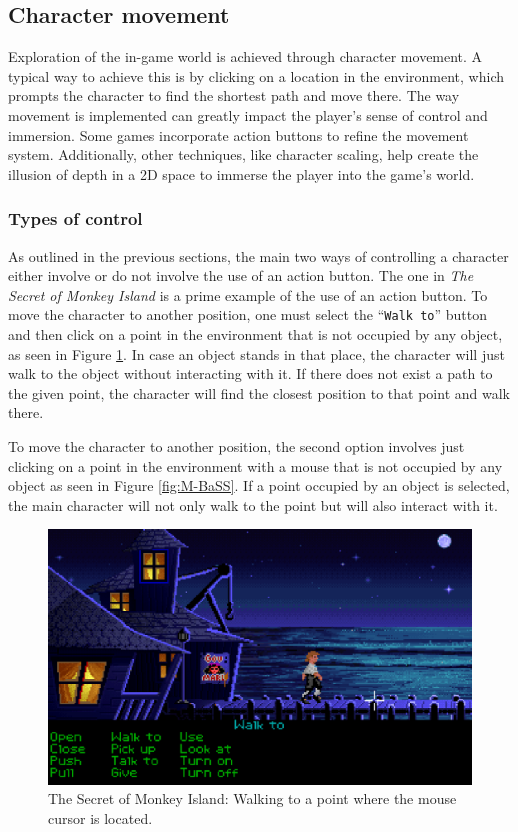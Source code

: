 \subsection{Character movement}
\label{sec:Character movement}
Exploration of the in-game world is achieved through character movement. A typical way to achieve this is by clicking on a location in the environment, which prompts the character to find the shortest path and move there. The way movement is implemented can greatly impact the player's sense of control and immersion. Some games incorporate action buttons to refine the movement system. Additionally, other techniques, like character scaling, help create the illusion of depth in a 2D space to immerse the player into the game's world.

\subsubsection{Types of control}
As outlined in the previous sections, the main two ways of controlling a character either involve or do not involve the use of an action button. The one in \textit{The Secret of Monkey Island} is a prime example of the use of an action button. To move the character to another position, one must select the “\texttt{Walk to}” button and then click on a point in the environment that is not occupied by any object, as seen in Figure \ref{fig:M-TSoMI-W}. In case an object stands in that place, the character will just walk to the object without interacting with it. If there does not exist a path to the given point, the character will find the closest position to that point and walk there.

To move the character to another position, the second option involves just clicking on a point in the environment with a mouse that is not occupied by any object as seen in Figure \ref{fig:M-BaSS}. If a point occupied by an object is selected, the main character will not only walk to the point but will also interact with it.

\begin{figure}[H]
\centering
\includegraphics[width=.75\linewidth]{img/W-TSoMI.png}
\caption{The Secret of Monkey Island: Walking to a point where the mouse cursor is located.}
\label{fig:M-TSoMI-W}
\end{figure}

